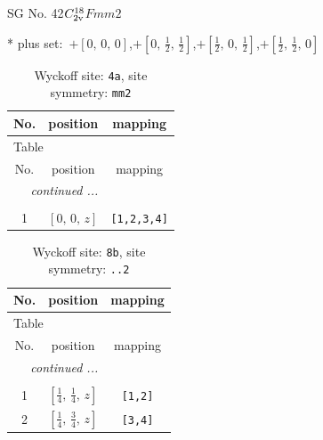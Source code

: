 \documentclass[fleqn,8pt]{jsarticle}
\begin{document}
\setcounter{MaxMatrixCols}{32}

\renewcommand{\tablename}{Table~}
\renewcommand{\figurename}{Figure~}
\begin{center}
\LARGE
SG No. 42\quad$C_{\rm 2v}^{18}$\quad$Fmm2$\quad[ orthorhombic ]
\end{center}
* plus set:\,\,\,$+\left[ 0,\, 0,\, 0 \right]$,\quad $+\left[ 0,\, \frac{1}{2},\, \frac{1}{2} \right]$,\quad $+\left[ \frac{1}{2},\, 0,\, \frac{1}{2} \right]$,\quad $+\left[ \frac{1}{2},\, \frac{1}{2},\, 0 \right]$
\renewcommand{\arraystretch}{1.2}
\begin{longtable}{ccc}
\caption{Wyckoff site: {\tt 4a}, site symmetry: {\tt mm2}}
 \\
 \hline \hline
No. & position & mapping \\ \hline \endfirsthead

\multicolumn{2}{l}{\tablename\ \thetable{}} \\
 \hline \hline
No. & position & mapping \\ \hline \endhead

 \hline \hline
\multicolumn{2}{r}{\footnotesize\it continued ...} \\ \endfoot

 \hline \hline
\multicolumn{2}{r}{} \\ \endlastfoot

1 & $\left[ 0,\, 0,\, z \right]$ & {\tt [1,2,3,4]} \\
\end{longtable}
\renewcommand{\arraystretch}{1.2}
\begin{longtable}{ccc}
\caption{Wyckoff site: {\tt 8b}, site symmetry: {\tt ..2}}
 \\
 \hline \hline
No. & position & mapping \\ \hline \endfirsthead

\multicolumn{2}{l}{\tablename\ \thetable{}} \\
 \hline \hline
No. & position & mapping \\ \hline \endhead

 \hline \hline
\multicolumn{2}{r}{\footnotesize\it continued ...} \\ \endfoot

 \hline \hline
\multicolumn{2}{r}{} \\ \endlastfoot

1 & $\left[ \frac{1}{4},\, \frac{1}{4},\, z \right]$ & {\tt [1,2]} \\ \hline
2 & $\left[ \frac{1}{4},\, \frac{3}{4},\, z \right]$ & {\tt [3,4]} \\
\end{longtable}
\end{document}
